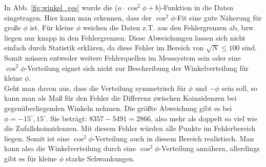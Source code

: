 In Abb. \ref{fig:winkel_ges} wurde die ($a \cdot \cos^2{\phi} + b$)-Funktion in die Daten eingetragen. Hier kann man erkennen, dass der  $\cos^2{\phi}$-Fit eine gute Näherung für große $\phi$ ist. Für kleine $\phi$ weichen die Daten z.T. aus den Fehlergrenzen ab, bzw. liegen nur knapp in den Fehlergrenzen. Diese Abweichungen lassen sich nicht einfach durch Statistik erklären, da diese Fehler im Bereich von $\sqrt{N} \leq 100$ sind. Somit müssen entweder weitere Fehlerquellen im Messsystem sein oder eine $\cos^2{\phi}$-Verteilung eignet sich nicht zur Beschreibung der Winkelverteilung für kleine $\phi$.\\

Geht man davon aus, dass die Verteilung symmetrisch für $\phi$ und $-\phi$ sein soll, so kann man als Maß für den Fehler die Differenz zwischen Koinzidenzen bei gegenüberliegenden Winkeln nehmen. Die größte Abweichung gibt es bei $\phi = -15^\circ,15^\circ$. Sie beträgt: $8357
 - 5491 = 2866$, also mehr als doppelt so viel wie die Zufallskoinzidenzen. Mit diesem Fehler würden alle Punkte im Fehlerbereich liegen. Somit ist eine $\cos^2{\phi}$-Verteilung auch in diesem Bereich realistisch. Man kann also die Winkelverteilung durch eine $\cos^2{\phi}$-Verteilung annähern, allerdings gibt es für kleine $\phi$ starke Schwankungen.